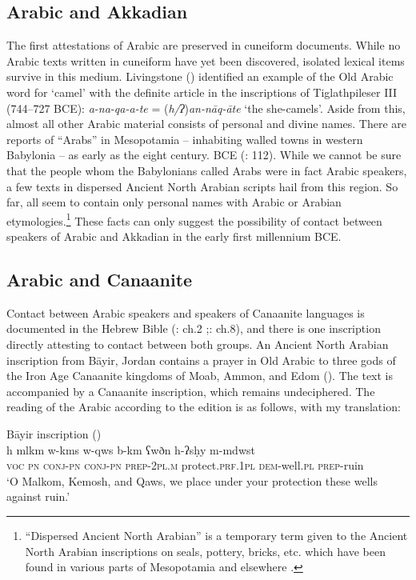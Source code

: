 \documentclass[output=paper]{langsci/langscibook}
\begin{document}
\subsection{Arabic and Akkadian}
The first attestations of Arabic are preserved in cuneiform documents. While no Arabic texts written in cuneiform have yet been discovered, isolated lexical items survive in this medium. Livingstone (\citeyear{Livingstone1997}) identified an example of the Old Arabic word for `camel' with the definite article in the inscriptions of Tiglathpileser III (744--727 BCE): \textit{a-na-qa-a-te} = (\textit{h/ʔ})\textit{an-nāq-āte} ‘the she-camels’. Aside from this, almost all other Arabic material consists of personal and divine names. There are reports of “Arabs” in Mesopotamia – inhabiting walled towns in western Babylonia – as early as the eight century. BCE (\citealt{Ephal1974}: 112). While we cannot be sure that the people whom the Babylonians called Arabs were in fact Arabic speakers, a few texts in dispersed Ancient North Arabian scripts hail from this region. So far, all seem to contain only personal names with Arabic or Arabian etymologies.\footnote{``Dispersed Ancient North Arabian'' is a temporary term given to the Ancient North Arabian inscriptions on seals, pottery, bricks, etc. which have been found in various parts of Mesopotamia and elsewhere \citep[33]{Macdonald2000}.}  These facts can only suggest the possibility of contact between speakers of Arabic and Akkadian in the early first millennium BCE.

\subsection{Arabic and Canaanite}\label{Canaanite}
Contact between Arabic speakers and speakers of Canaanite languages is documented in the Hebrew Bible (\citealt{Ephal1982}: ch.2 ;\citealt{Retsö2003}: ch.8), and there is one inscription directly attesting to contact between both groups. An Ancient North Arabian inscription from Bāyir, Jordan contains a prayer in Old Arabic to three gods of the Iron Age Canaanite kingdoms of Moab, Ammon, and Edom (\citealt{Hayajnehetal2015}). The text is accompanied by a Canaanite inscription, which remains undeciphered. The reading of the Arabic according to the edition is as follows, with my translation:

\ea Bāyir inscription (\citealt{Hayajnehetal2015})\\
\gll h 	mlkm 	w-kms 	w-qws 	b-km 		   ʕwðn h-ʔsḥy 		m-mdwst	\\
     \textsc{voc} \textsc{pn} \textsc{conj-pn} \textsc{conj-pn} \textsc{prep-2pl.m} protect.\textsc{prf.1pl} \textsc{dem}-well.\textsc{pl} \textsc{prep}-ruin \\
\glt ‘O Malkom, Kemosh, and Qaws, we place under your protection these wells against ruin.’
\z
\end{document}
